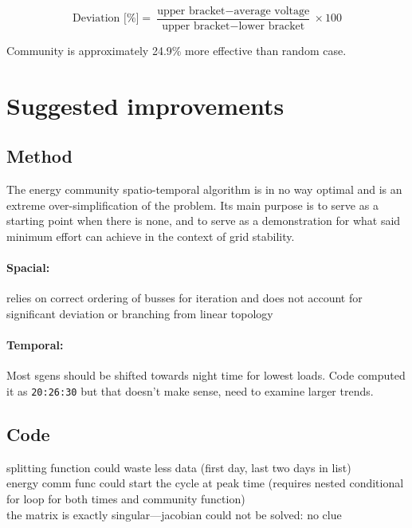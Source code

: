 \documentclass[a4paper,10pt]{report}
\begin{document}
\begin{equation}
	\text{Deviation [\%]} = \frac{\text{upper bracket} - \text{average voltage}}{\text{upper bracket}-\text{lower bracket}}\times 100
\end{equation}

Community is approximately 24.9\% more effective than random case.

\section{Suggested improvements}\label{section_improvements}
\subsection{Method}
The energy community spatio-temporal algorithm is in no way optimal and is an extreme over-simplification of the problem. Its main purpose is to serve as a starting point when there is none, and to serve as a demonstration for what said minimum effort can achieve in the context of grid stability.\\

\paragraph{Spacial:} relies on correct ordering of busses for iteration and does not account for significant deviation or branching from linear topology\\

\paragraph{Temporal:} Most sgens should be shifted towards night time for lowest loads. Code computed it as \texttt{20:26:30} but that doesn't make sense, need to examine larger trends.


\subsection{Code}
splitting function could waste less data (first day, last two days in list)\\
energy comm func could start the cycle at peak time (requires nested conditional for loop for both times and community function)\\
the matrix is exactly singular---jacobian could not be solved: no clue\\
\end{document}
